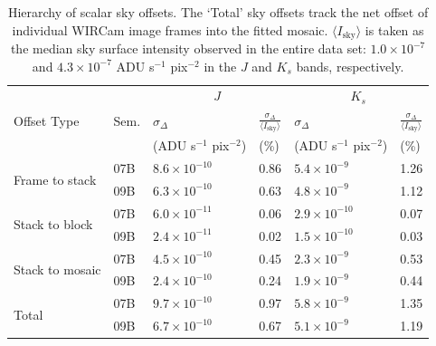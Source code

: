 \documentclass[iop]{emulateapj}
\begin{document}
\begin{table}[t]
    \centering
    \caption[Hierarchy of scalar sky offsets]{Hierarchy of scalar sky offsets. The `Total' sky offsets track the net offset of individual WIRCam image frames into the fitted mosaic. $\langle I_\mathrm{sky}\rangle$ is taken as the median sky surface intensity observed in the entire data set: $1.0\times 10^{-7}$ and $4.3\times 10^{-7}$ ADU s$^{-1}$ pix$^{-2}$ in the $J$ and $K_s$ bands, respectively.}
    \label{tab:offset_hierarchy}
\begin{tabular}{ll|ll|ll}
 &  & \multicolumn{2}{c|}{$J$} & \multicolumn{2}{c}{$K_s$} \\ %
Offset Type & Sem. & $\sigma_\Delta$ & $\frac{\sigma_\Delta}{\langle I_\mathrm{sky}\rangle }$ & $\sigma_\Delta$ & $\frac{\sigma_\Delta}{\langle I_\mathrm{sky}\rangle }$ \\
 & & \tiny{(ADU s$^{-1}$ pix$^{-2}$)} &  \tiny{(\%)} & \tiny{(ADU s$^{-1}$ pix$^{-2}$)} &  \tiny{(\%)} \\
\hline
\multirow{2}{*}{Frame to stack} & 07B & $8.6\times 10^{-10}$ & 0.86 & $5.4\times 10^{-9}$ & 1.26\\
 & 09B  & $6.3\times 10^{-10}$ & 0.63 & $4.8\times 10^{-9}$ & 1.12\\
\hline
\multirow{2}{*}{Stack to block} & 07B & $6.0\times 10^{-11}$ & 0.06 & $2.9\times 10^{-10}$ & 0.07\\
  & 09B & $2.4\times 10^{-11}$ & 0.02 & $1.5\times 10^{-10}$ & 0.03\\
\hline
\multirow{2}{*}{Stack to mosaic} & 07B & $4.5\times 10^{-10}$ & 0.45 & $2.3\times 10^{-9}$ & 0.53\\
  & 09B & $2.4\times 10^{-10}$ & 0.24 & $1.9\times 10^{-9}$ & 0.44\\
\hline
\multirow{2}{*}{Total} & 07B & $9.7\times 10^{-10}$ & 0.97 & $5.8\times 10^{-9}$ & 1.35 \\
  & 09B & $6.7\times 10^{-10}$ & 0.67 & $5.1\times 10^{-9}$ & 1.19 \\
\end{tabular}


\end{table}
\end{document}

